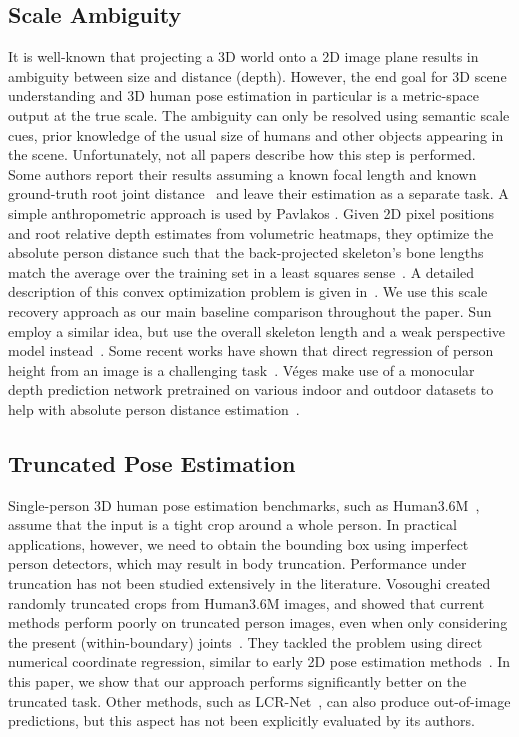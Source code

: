 \subsection{Scale Ambiguity}
It is well-known that projecting a 3D world onto a 2D image plane results in ambiguity between size and distance (depth).
However, the end goal for 3D scene understanding and 3D human pose estimation in particular is a metric-space output at the true scale.
The ambiguity can only be resolved using semantic scale cues, \ie prior knowledge of the usual size of humans and other objects appearing in the scene.
Unfortunately, not all papers describe how this step is performed.
Some authors report their results assuming a known focal length and known ground-truth root joint distance~\cite{Nibali19WACV,Sun18ECCV,Sun18Github,Chen19BMVC} and leave their estimation as a separate task.
A simple anthropometric approach is used by Pavlakos \etal.
Given 2D pixel positions and root relative depth estimates from volumetric heatmaps, they optimize the absolute person distance such that the back-projected skeleton's bone lengths match the average over the training set in a least squares sense~\cite{Pavlakos17CVPR}.
A detailed description of this convex optimization problem is given in~\cite{Pavlakos17CVPRsupp}. 
We use this scale recovery approach as our main baseline comparison throughout the paper.
Sun \etal employ a similar idea, but use the overall skeleton length and a weak perspective model instead~\cite{Sun18Arxiv}.
Some recent works have shown that direct regression of person height from an image is a challenging task~\cite{Gunel18Arxiv,Dantcheva18ICPR}.
V\'eges \etal make use of a monocular depth prediction network pretrained on various indoor and outdoor datasets to help with absolute person distance estimation~\cite{Veges19Arxiv}.

\subsection{Truncated Pose Estimation}
Single-person 3D human pose estimation benchmarks, such as Human3.6M~\cite{Ionescu11ICCV,Ionescu14PAMI}, assume that the input is a tight crop around a whole person.
In practical applications, however, we need to obtain the bounding box using imperfect person detectors, which may result in body truncation.
Performance under truncation has not been studied extensively in the literature.
Vosoughi \etal created randomly truncated crops from Human3.6M images, and showed that current methods perform poorly on truncated person images, even when only considering the present (within-boundary) joints~\cite{Vosoughi18ICIP}.
They tackled the problem using direct numerical coordinate regression, similar to early 2D pose estimation methods~\cite{Toshev14CVPR}.
In this paper, we show that our approach performs significantly better on the truncated task.
Other methods, such as LCR-Net~\cite{Rogez17CVPR}, can also produce out-of-image predictions, but this aspect has not been explicitly evaluated by its authors.
